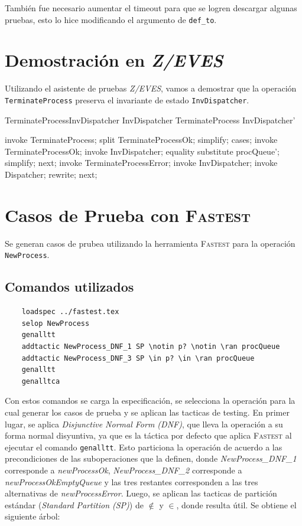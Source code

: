 \documentclass{article}
\begin{document}
También fue necesario aumentar el timeout para que se logren descargar algunas pruebas, esto lo hice modificando el argumento de \verb|def_to|.

\section{Demostración en \textit{Z/EVES}}

Utilizando el asistente de pruebas \textit{Z/EVES}, vamos a demostrar que la operación \verb|TerminateProcess| preserva el invariante de estado \verb|InvDispatcher|.

\begin{theorem}{TerminateProcessInvDispatcher}
    InvDispatcher \land TerminateProcess \implies InvDispatcher'
\end{theorem}

\begin{zproof}[TerminateProcessInvDispatcher]
    invoke TerminateProcess;
    split TerminateProcessOk;
    simplify;
    cases;
    invoke TerminateProcessOk;
    invoke InvDispatcher;
    equality substitute procQueue';
    simplify;
    next;
    invoke TerminateProcessError;
    invoke InvDispatcher;
    invoke \Xi Dispatcher;
    rewrite;
    next;
\end{zproof}

\section{Casos de Prueba con \textsc{Fastest}}

Se generan casos de prubea utilizando la herramienta \textsc{Fastest} para la operación \verb|NewProcess|.

\subsection*{Comandos utilizados}

\begin{verbatim}
    loadspec ../fastest.tex
    selop NewProcess
    genalltt
    addtactic NewProcess_DNF_1 SP \notin p? \notin \ran procQueue
    addtactic NewProcess_DNF_3 SP \in p? \in \ran procQueue
    genalltt
    genalltca
\end{verbatim}

Con estos comandos se carga la especificación, se selecciona la operación para la cual generar los casos de prueba y se aplican las tacticas de testing.
En primer lugar, se aplica \textit{Disjunctive Normal Form (DNF)}, que lleva la operación a su forma normal disyuntiva, ya que es la táctica por defecto que aplica \textsc{Fastest} al ejecutar el comando \verb|genalltt|. 
Esto particiona la operación de acuerdo a las precondiciones de las suboperaciones que la definen, donde \textit{NewProcess\_DNF\_1} corresponde a \textit{newProcessOk}, \textit{NewProcess\_DNF\_2} corresponde a \textit{newProcessOkEmptyQueue} y las tres restantes corresponden a las tres alternativas de \textit{newProcessError}.
Luego, se aplican las tacticas de partición estándar (\textit{Standard Partition (SP)}) de $\not\in$ y $\in$, donde resulta útil. Se obtiene el siguiente árbol:
\end{document}

